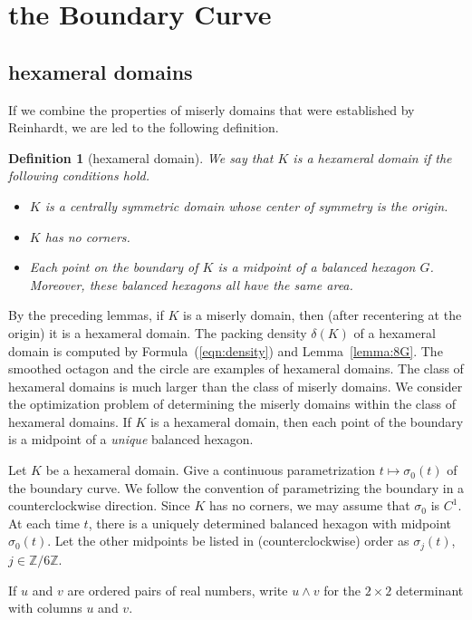 \documentclass[11pt]{amsart}
\newtheorem{definition}[equation]{Definition}
\newcommand{\ring}[1]{\mathbb{#1}}
\def\deltalat{\mathbb\delta}  %
\def\rZ{{\ring{Z}}}
\begin{document}
\section{the Boundary Curve}


\subsection{hexameral domains}

If we combine the properties of miserly domains that were established
by Reinhardt, we are led to the following definition.

\begin{definition}[hexameral domain]
We say that $K$ is a hexameral domain if the following conditions hold.
\begin{itemize}
\item $K$ is a centrally symmetric domain whose center of symmetry is the origin.
\item $K$ has no corners.
\item Each point on
the boundary of $K$ is a midpoint of a balanced
hexagon $G$.  Moreover, these balanced hexagons all have the same area.
\end{itemize}
\end{definition}

By the preceding lemmas, if $K$ is a miserly domain, then (after
recentering at the origin) it is a hexameral domain.  The packing density
$\deltalat(K)$ of a hexameral domain is computed by
Formula~(\ref{eqn:density}) and Lemma~\ref{lemma:8G}.  The smoothed
octagon and the circle are examples of hexameral domains.  The class
of hexameral domains is much larger than the class of miserly domains.
We consider the optimization problem of determining the miserly domains
within the class of hexameral domains.  If $K$ is a hexameral domain,
then each point of the boundary is a midpoint of a {\it unique}
balanced hexagon.

Let $K$ be a hexameral domain.  Give a continuous parametrization
$t\mapsto\sigma_0(t)$ of the boundary curve.  We follow the convention
of parametrizing the boundary in a counterclockwise direction.  Since
$K$ has no corners, we may assume that $\sigma_0$ is $C^1$.  At each
time $t$, there is a uniquely determined balanced hexagon with
midpoint $\sigma_0(t)$. Let the other midpoints be listed in
(counterclockwise) order as $\sigma_j(t)$, $j\in\rZ/6\rZ$.

If $u$ and $v$ are ordered pairs of real numbers, write
$u\land v$ for the $2\times 2$ determinant with columns $u$ and $v$.
\end{document}
